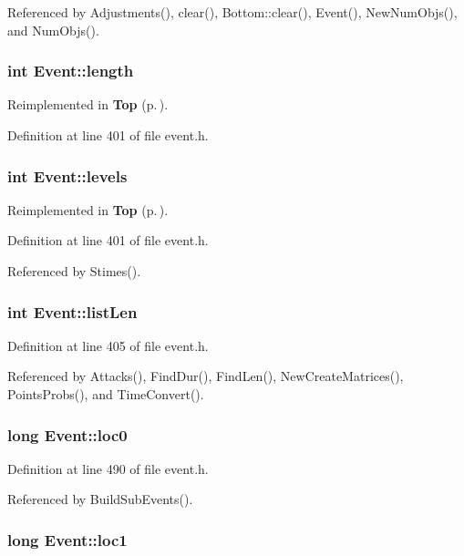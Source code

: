 Referenced by Adjustments(), clear(), Bottom::clear(), Event(), New\-Num\-Objs(), and Num\-Objs().
\subsubsection{\setlength{\rightskip}{0pt plus 5cm}int {\bf Event::length}}\label{classEvent_o20}




Reimplemented in {\bf Top} {\rm (p.\,\pageref{classTop_r2})}.

Definition at line 401 of file event.h.
\subsubsection{\setlength{\rightskip}{0pt plus 5cm}int {\bf Event::levels}}\label{classEvent_o19}




Reimplemented in {\bf Top} {\rm (p.\,\pageref{classTop_r1})}.

Definition at line 401 of file event.h.

Referenced by Stimes().
\subsubsection{\setlength{\rightskip}{0pt plus 5cm}int {\bf Event::list\-Len}}\label{classEvent_o26}




Definition at line 405 of file event.h.

Referenced by Attacks(), Find\-Dur(), Find\-Len(), New\-Create\-Matrices(), Points\-Probs(), and Time\-Convert().
\subsubsection{\setlength{\rightskip}{0pt plus 5cm}long {\bf Event::loc0}}\label{classEvent_o42}




Definition at line 490 of file event.h.

Referenced by Build\-Sub\-Events().
\subsubsection{\setlength{\rightskip}{0pt plus 5cm}long {\bf Event::loc1}}\label{classEvent_o43}




